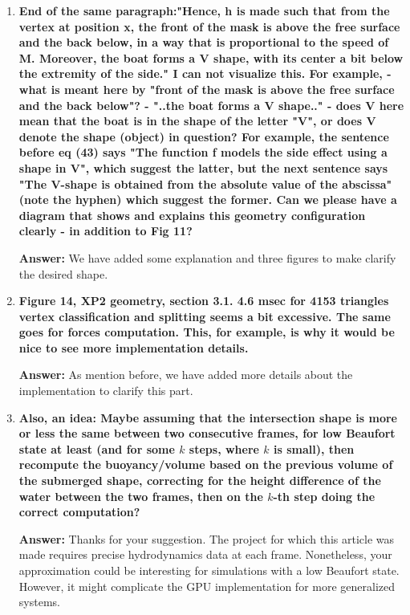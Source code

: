\documentclass{article}
\newcommand{\answer}[1]{\textbf{\textcolor{answercolor}{Answer:}} \textcolor{answercolor}{#1}}
\begin{document}
\begin{enumerate}[label=\textbf{\arabic*.}]
	\item \textbf{End of the same paragraph:"Hence, h is made such that from the vertex at position x, the front of the mask is above the free surface and the back below, in a way that is proportional to the speed of M. Moreover, the boat forms a V shape, with its center a bit below the extremity of the side."
		      I can not visualize this. For example,
		      - what is meant here by "front of the mask is above the free surface and the back below"?
		      - "..the boat forms a V shape.." - does V here mean that the boat is in the shape of the letter "V", or does V denote the shape (object) in question? For example, the sentence before eq (43) says "The function f models the side effect using a shape in V", which suggest the latter, but the next sentence says "The V-shape is obtained from the absolute value of the abscissa" (note the hyphen) which suggest the former.
		      Can we please have a diagram that shows and explains this geometry configuration clearly - in addition to Fig 11?}

	      \answer{We have added some explanation and three figures to make clarify the desired shape.}

	\item \textbf{Figure 14, XP2 geometry, section 3.1. 4.6 msec for 4153 triangles vertex classification and splitting seems a bit excessive. The same goes for forces computation. This, for example, is why it would be nice to see more implementation details.}

	      \answer{As mention before, we have added more details about the implementation to clarify this part.}

	\item \textbf{Also, an idea: Maybe assuming that the intersection shape is more or less the same between two consecutive frames, for low Beaufort state at least (and for some $k$ steps, where $k$ is small), then recompute the buoyancy/volume based on the previous volume of the submerged shape, correcting for the height difference of the water between the two frames, then on the $k$-th step doing the correct computation?}

	      \answer{Thanks for your suggestion. The project for which this article was made requires precise hydrodynamics data at each frame. Nonetheless, your approximation could be interesting for simulations with a low Beaufort state. However, it might complicate the GPU implementation for more generalized systems.}


\end{enumerate}
\end{document}
